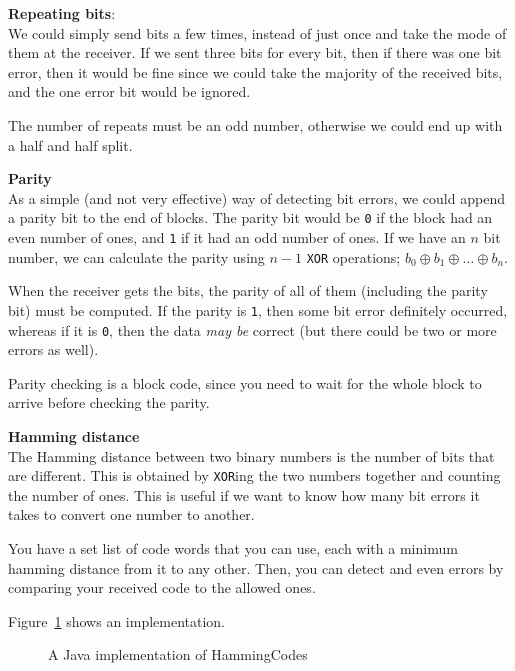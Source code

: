 \begin{description}
  \item \textbf{Repeating bits}:\\
    We could simply send bits a few times, instead of just once and take the 
    mode of them at the receiver. If we sent three bits for every bit, then
    if there was one bit error, then it would be fine since we could take the 
    majority of the received bits, and the one error bit would be ignored.

    The number of repeats must be an odd number, otherwise we could end up with 
    a half and half split.
  \item \textbf{Parity}\\
    As a simple (and not very effective) way of detecting bit errors, we could
    append a parity bit to the end of blocks. The parity bit would be \texttt{0}
    if the block had an even number of ones, and \texttt{1} if it had an odd
    number of ones. If we have an $n$ bit number, we can calculate the parity
    using $n - 1$ \texttt{XOR} operations; $b_0 \oplus b_1 \oplus \dots \oplus
    b_n$.

    When the receiver gets the bits, the parity of all of them (including the
    parity bit) must be computed. If the parity is \texttt{1}, then some bit
    error definitely occurred, whereas if it is \texttt{0}, then the data
    \textit{may be} correct (but there could be two or more errors as well).

    Parity checking is a block code, since you need to wait for the whole block
    to arrive before checking the parity.
  \item \textbf{Hamming distance}\\
    The Hamming distance between two binary numbers is the number of bits that
    are different. This is obtained by \texttt{XOR}ing the two numbers together
    and counting the number of ones. This is useful if we want to know how many
    bit errors it takes to convert one number to another.

    You have a set list of code words that you can use, each with a minimum
    hamming distance from it to any other. Then, you can detect and even errors
    by comparing your received code to the allowed ones.

    Figure~\ref{HammingCodes} shows an implementation.

    \begin{figure}
      
      \label{HammingCodes}
      \caption{A Java implementation of HammingCodes}
    \end{figure}


\end{description}

